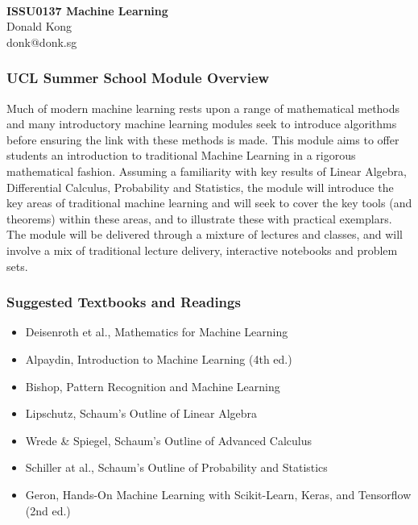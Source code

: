 \documentclass[11pt]{article}
\begin{document}
\thispagestyle{empty}
\bigskip \
\vspace{0.1cm}

\begin{center}
{\fontsize{30}{30} \selectfont \bf \sffamily ISSU0137 Machine Learning }\\
\vspace{24pt}
{\fontsize{14}{14} \selectfont \rmfamily Donald Kong} \\
\vspace{6pt}
{\fontsize{12}{12} \selectfont \ttfamily donk@donk.sg} \\
\vspace{24pt}
\end{center}

{\parindent0pt \baselineskip=15.5pt 
  \subsubsection{UCL Summer School Module Overview}
  Much of modern machine learning rests upon a range of mathematical methods
  and many introductory machine learning modules seek to introduce algorithms
  before ensuring the link with these methods is made. This module aims to
  offer students an introduction to traditional Machine Learning in a rigorous
  mathematical fashion. Assuming a familiarity with key results of Linear
  Algebra, Differential Calculus, Probability and Statistics, the module will
  introduce the key areas of traditional machine learning and will seek to
  cover the key tools (and theorems) within these areas, and to illustrate
  these with practical exemplars. The module will be delivered through a
  mixture of lectures and classes, and will involve a mix of traditional
  lecture delivery, interactive notebooks and problem sets.
  \subsubsection{Suggested Textbooks and Readings}
  \begin{itemize}
    \item Deisenroth et al., Mathematics for Machine Learning
    \item Alpaydin, Introduction to Machine Learning (4th ed.)
    \item Bishop, Pattern Recognition and Machine Learning
    \item Lipschutz, Schaum's Outline of Linear Algebra
    \item Wrede \& Spiegel, Schaum's Outline of Advanced Calculus
    \item Schiller at al., Schaum's Outline of Probability and Statistics
    \item Geron, Hands-On Machine Learning with Scikit-Learn, Keras, and Tensorflow (2nd ed.)
  \end{itemize}
}

\microtoc%
\newpage










\end{document}
